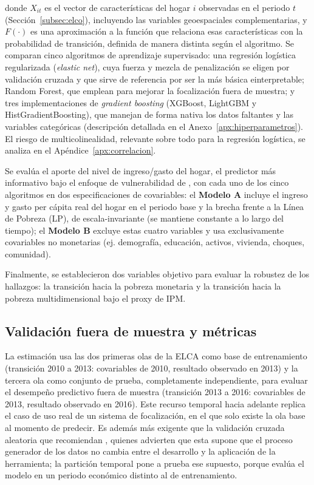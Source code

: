 \documentclass[12pt, letterpaper]{article}
\begin{document}
\noindent donde $X_{it}$ es el vector de características del hogar $i$
observadas en el periodo $t$ (Sección~\ref{subsec:elco}), 
incluyendo las variables geoespaciales complementarias, y $F(\cdot)$ es
una aproximación a la función que relaciona esas características con la probabilidad de
transición, definida de manera distinta según el algoritmo. Se
comparan cinco algoritmos de aprendizaje supervisado: una regresión logística regularizada
(\emph{elastic net}), cuya fuerza y mezcla de penalización se eligen por
validación cruzada y que sirve de referencia por ser la más básica einterpretable; Random
Forest, que \textcite{mcbride2018} emplean para mejorar la focalización
fuera de muestra; y tres implementaciones de \emph{gradient boosting}
(XGBoost, LightGBM y HistGradientBoosting), que manejan de forma nativa los
datos faltantes y las variables categóricas (descripción detallada en el
Anexo~\ref{apx:hiperparametros}). El riesgo de multicolinealidad,
relevante sobre todo para la regresión logística, se analiza en el
Apéndice~\ref{apx:correlacion}.

Se evalúa el aporte del nivel de ingreso/gasto del hogar, 
el predictor más informativo bajo el enfoque de vulnerabilidad de
\textcite{chaudhuri2002}, con cada uno de los cinco algoritmos en dos
especificaciones de covariables: el \textbf{Modelo A} incluye el ingreso y
gasto per cápita real del hogar en el periodo base y la brecha frente a la
Línea de Pobreza (LP), de escala-invariante (se mantiene constante
a lo largo del tiempo); el \textbf{Modelo B}
excluye estas cuatro variables y usa exclusivamente covariables no
monetarias (ej. demografía, educación, activos, vivienda, choques,
comunidad). 

Finalmente, se establecieron dos variables objetivo para evaluar 
la robustez de los hallazgos: la transición hacia la 
pobreza monetaria y la transición 
hacia la pobreza multidimensional bajo el proxy de IPM.

\subsection{Validación fuera de muestra y métricas}
\label{subsec:validacion}

La estimación usa las dos primeras olas de la ELCA como base de
entrenamiento (transición 2010 a 2013: covariables de 2010, resultado
observado en 2013) y la tercera ola como conjunto de prueba, completamente
independiente, para evaluar el desempeño predictivo fuera de muestra
(transición 2013 a 2016: covariables de 2013, resultado observado en
2016). Este recurso temporal hacia adelante replica el caso de uso
real de un sistema de focalización, en el que solo existe la ola base al
momento de predecir. Es además más exigente que la validación cruzada
aleatoria que recomiendan \textcite{mcbride2018}, quienes advierten que
esta supone que el proceso generador de los datos no cambia entre el
desarrollo y la aplicación de la herramienta; la partición temporal pone a
prueba ese supuesto, porque evalúa el modelo en un periodo económico
distinto al de entrenamiento.
\end{document}
